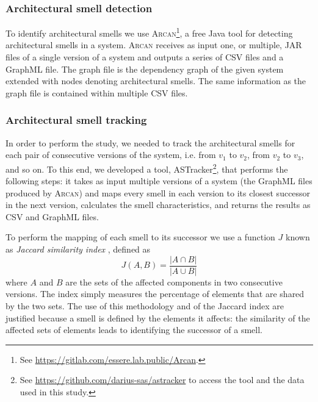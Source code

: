 \subsubsection{Architectural smell detection}
To identify architectural smells we use \textsc{Arcan}\footnote{\label{fn:Arcan}See \url{https://gitlab.com/essere.lab.public/Arcan}.}, a free Java tool for detecting architectural smells in a system.
\textsc{Arcan} receives as input one, or multiple, JAR files of a single version of a system and outputs a series of CSV files and a GraphML file. The graph file is the dependency graph of the given system extended with nodes denoting architectural smells. The same information as the graph file is contained within multiple CSV files.

\subsubsection{Architectural smell tracking}
In order to perform the study, we needed to track the architectural smells for each pair of consecutive versions of the system, i.e. from $v_1$ to $v_2$, from $v_2$ to $v_3$, and so on.
To this end, we developed a tool, ASTracker\footnote{\label{fn:astracker}See \url{https://github.com/darius-sas/astracker} to access the tool and the data used in this study.}, that performs the following steps: it takes as input multiple versions of a system (the GraphML files produced by \textsc{Arcan}) and maps every smell in each version to its closest successor in the next version, calculates the smell characteristics, and returns the results as CSV and GraphML files.

To perform the mapping of each smell to its successor we use a function $J$ known as \emph{Jaccard similarity index} \cite{Jaccard1912}, defined as
$$J(A, B) = \frac{|A \cap B|}{|A \cup B|}$$
where $A$ and $B$ are the sets of the affected components in two consecutive versions.
The index simply measures the percentage of elements that are shared by the two sets.
The use of this methodology and of the Jaccard index are justified because a smell is defined by the elements it affects: the similarity of the affected sets of elements leads to identifying the successor of a smell.

